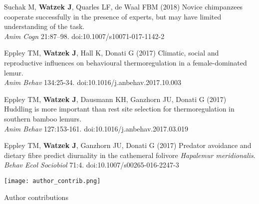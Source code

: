 \documentclass[]{friggeri-cv}
\begin{document}
\begin{enumerate}[label={[\,\arabic*\,]}]
  \enlargethispage{1.5\baselineskip}
  \item {Suchak M, \textbf{Watzek J}, Quarles LF, de Waal FBM (2018) Novice chimpanzees cooperate successfully in the presence of experts, but may have limited understanding of the task. \\\emph{Anim Cogn} 21:87–98. doi:10.1007/s10071-017-1142-2}
  \item {Eppley TM, \textbf{Watzek J}, Hall K, Donati G (2017) Climatic, social and reproductive influences on behavioural thermoregulation in a female-dominated lemur. \\\emph{Anim Behav} 134:25-34. doi:10.1016/j.anbehav.2017.10.003}
  \item {Eppley TM, \textbf{Watzek J}, Dausmann KH, Ganzhorn JU, Donati G (2017) Huddling is more important than rest site selection for thermoregulation in southern bamboo lemurs. \\\emph{Anim Behav} 127:153-161. doi:10.1016/j.anbehav.2017.03.019}
  \item {Eppley TM, \textbf{Watzek J}, Ganzhorn JU, Donati G (2017) Predator avoidance and dietary fibre predict diurnality in the cathemeral folivore \emph{Hapalemur meridionalis}. \\\emph{Behav Ecol Sociobiol} 71:4. doi:10.1007/s00265-016-2247-3} 
\end{enumerate}

\texttt{[image: author\_contrib.png]} %
\centerline{Author contributions}\\[.7cm]


\pagestyle{fancy}

\renewenvironment{aside}{%
  \let\oldsection\section
  \renewcommand{\section}[1]{
    \par\vspace{\baselineskip}{\Large\headingfont\color{headercolor} ##1}
  }
  \begin{textblock}{3.6}(1.5, 1.5)
  \begin{flushright}
  \obeycr
}{%
  \restorecr
  \end{flushright}
  \end{textblock}
  \let\section\oldsection
}
\end{document}
